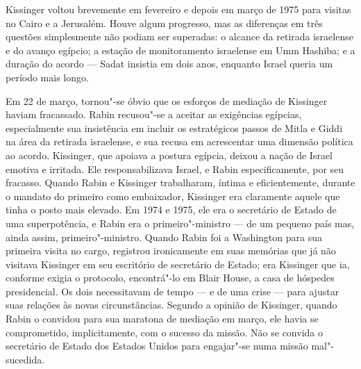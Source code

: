Kissinger voltou brevemente em fevereiro e depois em março de 1975
para visitas no Cairo e a Jerusalém. Houve algum progresso, mas as
diferenças em três questões simplesmente não podiam ser superadas: o
alcance da retirada israelense e do avanço egípcio; a estação de
monitoramento israelense em Umm Hashiba; e a duração do acordo --- Sadat
insistia em dois anos, enquanto Israel queria um período mais longo.

Em 22 de março, tornou"-se óbvio que os esforços de mediação de Kissinger
haviam fracassado. Rabin recusou"-se a aceitar as exigências egípcias,
especialmente sua insistência em incluir os estratégicos passos de Mitla
e Giddi na área da retirada israelense, e sua recusa em acrescentar uma
dimensão política ao acordo. Kissinger, que apoiava a postura egípcia,
deixou a nação de Israel emotiva e irritada. Ele responsabilizava Israel, e Rabin
especificamente, por seu fracasso. Quando Rabin e Kissinger trabalharam,
íntima e eficientemente, durante o mandato do primeiro como embaixador,
Kissinger era claramente aquele que tinha o posto mais elevado. Em 1974
e 1975, ele era o secretário de Estado de uma superpotência, e Rabin era
o primeiro"-ministro --- de um pequeno país mas, ainda
assim, primeiro"-ministro. Quando Rabin foi a Washington para sua
primeira visita no cargo, registrou ironicamente em suas
memórias que já não visitava Kissinger em seu escritório de secretário
de Estado; era Kissinger que ia, conforme exigia o protocolo,
encontrá"-lo em Blair House, a casa de hóspedes presidencial. Os dois
necessitavam de tempo --- e de uma crise --- para ajustar suas relações às
novas circunstâncias. Segundo a opinião de Kissinger, quando Rabin o
convidou para sua maratona de mediação em março, ele havia se
comprometido, implicitamente, com o sucesso da missão. Não se convida o
secretário de Estado dos Estados Unidos para engajar"-se numa missão mal"-sucedida.


